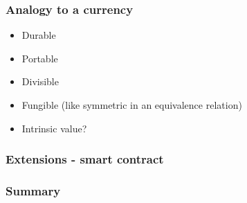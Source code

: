 \documentclass{beamer}
\begin{document}
\begin{frame}
\frametitle{Analogy to a currency}

\begin{itemize}
  \item Durable
  \item Portable
  \item Divisible
  \item Fungible (like symmetric in an equivalence relation)
  \item Intrinsic value?
\end{itemize}

\end{frame}

\begin{frame}
\frametitle{Extensions - smart contract}



\end{frame}

\begin{frame}
\frametitle{Summary}



\end{frame}
\end{document}

